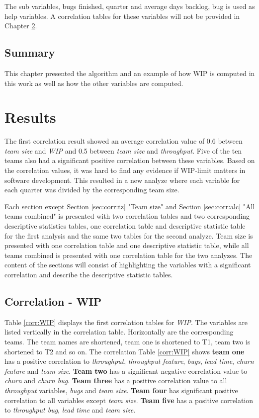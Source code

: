 \documentclass[UKenglish]{ifimaster}  %
\begin{document}
The sub variables, bugs finished, quarter and average days backlog, bug is used as help variables. A correlation tables for these variables will not be provided in Chapter \ref{ch:res}. 

\section{Summary}
This chapter presented the algorithm and an example of how WIP is computed in this work as well as how the other variables are computed.


\chapter{Results}                     
\label{ch:res}
The first correlation result showed an average correlation value  of 0.6 between \textit{team size} and \textit{WIP} and 0.5 between \textit{team size} and \textit{throughput}. Five of the ten teams also had a significant positive correlation between these variables. Based on the correlation values, it was hard to find any evidence if WIP-limit matters in software development. This resulted in a new analyze where each variable for each quarter was divided by the corresponding team size. 

Each section except Section \ref{sec:corr:tz} "Team size"  and Section \ref{sec:corr:alc} "All teams combined" is presented with two correlation tables and two corresponding descriptive statistics tables, one correlation table and descriptive statistic table for the first analysis and the same two tables for the second analyze. {Team size} is presented with one correlation table and one descriptive statistic table, while all teams combined is presented  with one correlation table for the two analyzes. The content of the sections will consist of highlighting the variables with a significant correlation and describe the descriptive statistic tables.
\section{Correlation - WIP}
\label{sec:corr:WIP}
Table \ref{corr:WIP} displays the first correlation tables for \textit{WIP}. The variables are listed vertically in the correlation table. Horizontally are the corresponding teams. The team names are shortened, team one is shortened to T1, team two is shortened to T2 and so on.
The correlation Table \ref{corr:WIP} shows \textbf{team one} has a positive correlation to \textit{throughput}, \textit{throughput feature}, \textit{bugs}, \textit{lead time}, \textit{churn feature} and \textit{team size}. \textbf{Team two} has a significant negative correlation value to \textit{churn} and \textit{churn bug}. \textbf{Team three} has a positive correlation value to all \textit{throughput} variables, \textit{bugs} and \textit{team size}. \textbf{Team four} has significant positive correlation to all variables except \textit{team size}. \textbf{Team five} has a positive correlation to \textit{throughput bug}, \textit{lead time} and \textit{team size}.
\end{document}
